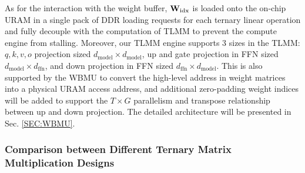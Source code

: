 \documentclass[sigconf]{acmart}
\begin{document}

 As for the interaction with the weight buffer, \( {\bf W}_{\text{idx}}\) is loaded onto the on-chip URAM in a single pack of DDR loading requests for each ternary linear operation and fully decouple with the computation of TLMM to prevent the compute engine from stalling. Moreover, our TLMM engine supports 3 sizes in the TLMM: $q,k,v,o$ projection sized $d_{\text{model}} \times d_{\text{model}}$, up and gate projection in FFN sized $d_{\text{model}} \times d_{\text{ffn}}$, and down projection in FFN sized $d_{\text{ffn}} \times d_{\text{model}}$. This is also supported by the WBMU to convert the high-level address in weight matrices into a physical URAM access address, and additional zero-padding weight indices will be added to support the $T \times G$ parallelism and transpose relationship between up and down projection. The detailed architecture will be presented in Sec. \ref{SEC:WBMU}.

\subsubsection{Comparison between Different Ternary Matrix Multiplication Designs} \label{sec:TLMM_METHODS}
\end{document}
